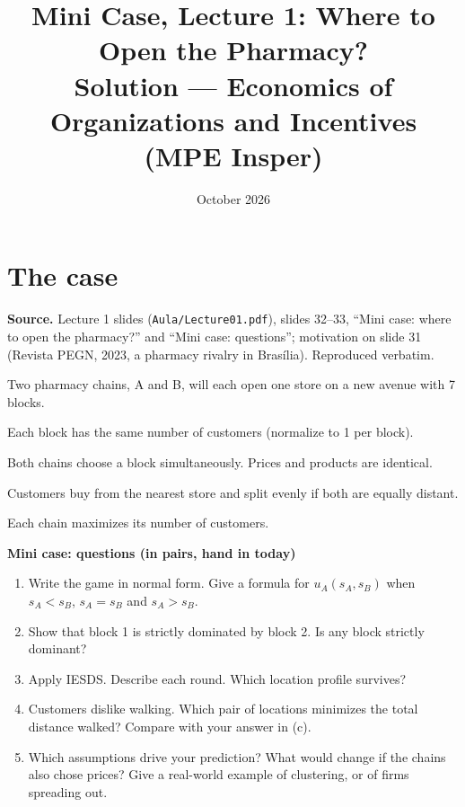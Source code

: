 \documentclass[11pt,a4paper]{article}
\title{\textbf{Mini Case, Lecture 1: Where to Open the Pharmacy?}\\[4pt]
  \large Solution --- Economics of Organizations and Incentives (MPE Insper)}
\date{October 2026}
\begin{document}
\maketitle
\thispagestyle{empty}

\section*{The case}

\textbf{Source.} Lecture 1 slides (\texttt{Aula/Lecture01.pdf}), slides 32--33, ``Mini case: where to
open the pharmacy?'' and ``Mini case: questions''; motivation on slide 31 (Revista PEGN, 2023, a
pharmacy rivalry in Brasília). Reproduced verbatim.

\begin{tcolorbox}[colback=src!4,colframe=src,boxrule=0.5pt]
Two pharmacy chains, A and B, will each open one store on a new avenue with 7 blocks.

\begin{center}
\end{center}

Each block has the same number of customers (normalize to 1 per block).

Both chains choose a block simultaneously. Prices and products are identical.

Customers buy from the nearest store and split evenly if both are equally distant.

Each chain maximizes its number of customers.

\medskip
\textbf{Mini case: questions (in pairs, hand in today)}
\begin{enumerate}[label=(\alph*)]
  \item Write the game in normal form. Give a formula for $u_A(s_A, s_B)$ when $s_A < s_B$,
        $s_A = s_B$ and $s_A > s_B$.
  \item Show that block 1 is strictly dominated by block 2. Is any block strictly dominant?
  \item Apply IESDS. Describe each round. Which location profile survives?
  \item Customers dislike walking. Which pair of locations minimizes the total distance walked?
        Compare with your answer in (c).
  \item Which assumptions drive your prediction? What would change if the chains also chose
        prices? Give a real-world example of clustering, or of firms spreading out.
\end{enumerate}
\end{tcolorbox}
\end{document}
